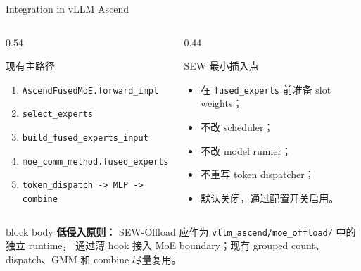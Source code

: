 \documentclass[aspectratio=169,10pt]{beamer}
\begin{document}
\begin{frame}[t]{Integration in vLLM Ascend}
\small
\vspace{-0.35em}

\begin{columns}[T,onlytextwidth]
\begin{column}{0.54\textwidth}
\begin{block}{现有主路径}
\footnotesize
\begin{enumerate}
  \item \texttt{AscendFusedMoE.forward\_impl}
  \item \texttt{select\_experts}
  \item \texttt{build\_fused\_experts\_input}
  \item \texttt{moe\_comm\_method.fused\_experts}
  \item \texttt{token\_dispatch -> MLP -> combine}
\end{enumerate}
\end{block}
\end{column}

\begin{column}{0.44\textwidth}
\begin{block}{SEW 最小插入点}
\footnotesize
\begin{itemize}
  \item 在 \texttt{fused\_experts} 前准备 slot weights；
  \item 不改 scheduler；
  \item 不改 model runner；
  \item 不重写 token dispatcher；
  \item 默认关闭，通过配置开关启用。
\end{itemize}
\end{block}
\end{column}
\end{columns}

\vspace{0.7em}
\begin{beamercolorbox}[wd=\linewidth,sep=0.7em,rounded=true]{block body}
\textbf{\textcolor{AccentRed}{低侵入原则：}}
SEW-Offload 应作为 \texttt{vllm\_ascend/moe\_offload/} 中的独立 runtime，
通过薄 hook 接入 MoE boundary；现有 grouped count、dispatch、GMM 和 combine 尽量复用。
\end{beamercolorbox}
\end{frame}
\end{document}

